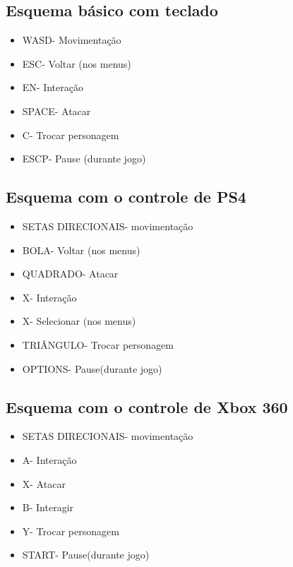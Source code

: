 \documentclass[12pt]{article}
\begin{document}
\subsection{Esquema básico com teclado}
\begin{itemize}
    \item \textbar W\textbar \textbar A\textbar \textbar S\textbar \textbar D\textbar - Movimentação
    \item \textbar ESC\textbar - Voltar (nos menus)
    \item \textbar E\textbar \textbar N\textbar - Interação
    \item \textbar SPACE\textbar - Atacar
    \item \textbar C\textbar - Trocar personagem
    \item \textbar ESC\textbar \textbar P\textbar - Pause (durante jogo)
\end{itemize}

\subsection{Esquema com o controle de PS4}
\begin{itemize}
    \item \textbar SETAS DIRECIONAIS\textbar - movimentação
    \item \textbar BOLA\textbar - Voltar (nos menus)
    \item \textbar QUADRADO\textbar - Atacar
    \item \textbar X\textbar - Interação
    \item \textbar X\textbar - Selecionar (nos menus)
    \item \textbar TRIÂNGULO\textbar - Trocar personagem
    \item \textbar OPTIONS\textbar - Pause(durante jogo)
\end{itemize}

\subsection{Esquema com o controle de Xbox 360}
\begin{itemize}
    \item \textbar SETAS DIRECIONAIS\textbar - movimentação
    \item \textbar A\textbar - Interação
    \item \textbar X\textbar - Atacar
    \item \textbar B\textbar - Interagir
    \item \textbar Y\textbar - Trocar personagem
    \item \textbar START\textbar - Pause(durante jogo)
\end{itemize}
\end{document}
